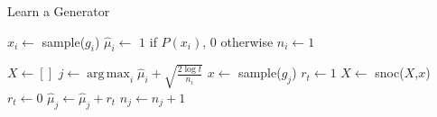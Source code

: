\documentclass[sigconf,nonacm]{acmart}
\DeclareMathOperator*{\argmax}{arg\,max}
\begin{document}
\begin{algorithm}
    \caption{Learn a Generator}
    \label{alg:ucb1}
    \begin{algorithmic}
      \State $x_i \gets $ sample($g_i$)
      \State $\hat{\mu}_i \gets$ $1$ if $P(x_i)$, $0$ otherwise
      \State $n_i \gets 1$

      \EndFor
      \State $X \gets []$
        \State $j \gets \argmax_i \hat{\mu}_i + \sqrt{\frac{2\log t}{n_i}}$
        \State $x \gets$ sample($g_j$)
          \State $r_t \gets 1$
          \State $X \gets$ snoc($X$,$x$)
        \Else
          \State $r_t \gets 0$
        \EndIf
        \State $\hat{\mu}_j \gets \hat{\mu}_j + r_t$
        \State $n_j \gets n_j + 1$
      \EndFor
      \EndFunction
    \end{algorithmic}
\end{algorithm}
\end{document}
